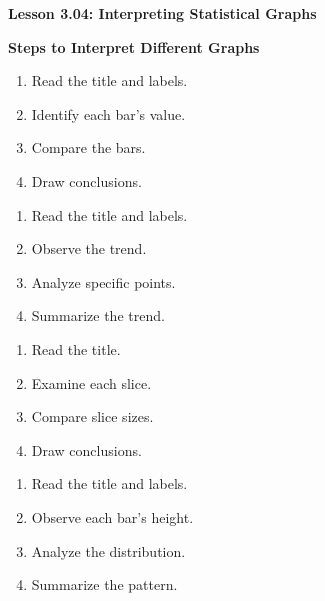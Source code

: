 \begin{center}
\textbf{Lesson 3.04: Interpreting Statistical Graphs}
\end{center}

\vspace*{-1.5ex}

\noindent\textbf{Steps to Interpret Different Graphs}
\begin{multicols}{2}				

\begin{enumerate}[label=\color{blue}\arabic*.]
    \item {Read the title and labels.}
    \item {Identify each bar’s value.}
    \item {Compare the bars.}
    \item {Draw conclusions.}
\end{enumerate}

\begin{enumerate}[label=\color{blue}\arabic*.]
    \item {Read the title and labels.}
    \item {Observe the trend.}
    \item {Analyze specific points.}
    \item {Summarize the trend.}
\end{enumerate}

\begin{enumerate}[label=\color{blue}\arabic*.]
    \item {Read the title.}
    \item {Examine each slice.}
    \item {Compare slice sizes.}
    \item {Draw conclusions.}
\end{enumerate}

\begin{enumerate}[label=\color{blue}\arabic*.]
    \item {Read the title and labels.}
    \item {Observe each bar’s height.}
    \item {Analyze the distribution.}
    \item {Summarize the pattern.}
\end{enumerate}
  
\end{multicols}
